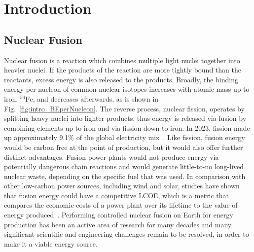 \chapter{Introduction} \label{chap:intro}


\section{Nuclear Fusion}%
\label{sec:intro_whatisfusion}

Nuclear fusion is a reaction which combines multiple light nuclei together into heavier nuclei.
If the products of the reaction are more tightly bound than the reactants, excess energy is also released to the products.
Broadly, the binding energy per nucleon of common nuclear isotopes increases with atomic mass up to iron, ${}^{56}\text{Fe}$, and decreases afterwards, as is shown in Fig.~\ref{fig:intro_BEperNucleon}.
The reverse process, nuclear fission, operates by splitting heavy nuclei into lighter products, thus energy is released via fusion by combining elements up to iron and via fission down to iron.
In 2023, fission made up approximately 9.1\% of the global electricity mix~\cite{ember_institute_statistical_2024}.
Like fission, fusion energy would be carbon free at the point of production, but it would also offer further distinct advantages.
Fusion power plants would not produce energy via potentially dangerous chain reactions and would generate little-to-no long-lived nuclear waste, depending on the specific fuel that was used.
In comparison with other low-carbon power sources, including wind and solar, studies have shown that fusion energy could have a competitive \ac{LCOE}, which is a metric that compares the economic costs of a power plant over its lifetime to the value of energy produced~\cite{griffiths_commercialisation_2022}.
Performing controlled nuclear fusion on Earth for energy production has been an active area of research for many decades and many significant scientific and engineering challenges remain to be resolved, in order to make it a viable energy source.


